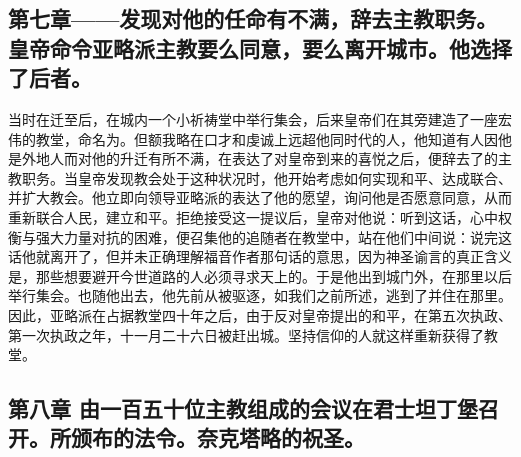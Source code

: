 \subsection{第七章——发现对他的任命有不满，辞去主教职务。皇帝命令亚略派主教要么同意，要么离开城市。他选择了后者。}

当时在迁至后，在城内一个小祈祷堂中举行集会，后来皇帝们在其旁建造了一座宏伟的教堂，命名为。但额我略在口才和虔诚上远超他同时代的人，他知道有人因他是外地人而对他的升迁有所不满，在表达了对皇帝到来的喜悦之后，便辞去了的主教职务。当皇帝发现教会处于这种状况时，他开始考虑如何实现和平、达成联合、并扩大教会。他立即向领导亚略派的表达了他的愿望，询问他是否愿意同意，从而重新联合人民，建立和平。拒绝接受这一提议后，皇帝对他说：听到这话，心中权衡与强大力量对抗的困难，便召集他的追随者在教堂中，站在他们中间说：说完这话他就离开了，但并未正确理解福音作者那句话的意思，因为神圣谕言的真正含义是，那些想要避开今世道路的人必须寻求天上的。于是他出到城门外，在那里以后举行集会。也随他出去，他先前从被驱逐，如我们之前所述，逃到了并住在那里。因此，亚略派在占据教堂四十年之后，由于反对皇帝提出的和平，在第五次执政、第一次执政之年，十一月二十六日被赶出城。坚持信仰的人就这样重新获得了教堂。\par


\subsection{第八章 由一百五十位主教组成的会议在君士坦丁堡召开。所颁布的法令。奈克塔略的祝圣。}


